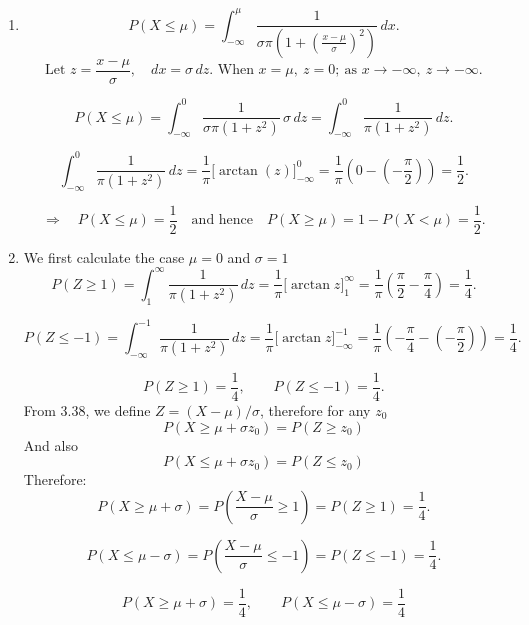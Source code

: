 \documentclass{article} %
\begin{document}
\begin{enumerate}
  \item
    \[
      P(X \le \mu)
      = \int_{-\infty}^{\mu}
      \frac{1}{\sigma\pi\left(1+\left(\frac{x-\mu}{\sigma}\right)^2\right)}\,dx.
    \]
    \[
      \text{Let } z=\frac{x-\mu}{\sigma},\quad dx=\sigma\,dz.
      \text{ When } x=\mu,\ z=0;\ \text{as } x\to -\infty,\ z\to -\infty.
    \]

    \[
      P(X \le \mu)
      = \int_{-\infty}^{0} \frac{1}{\sigma\pi(1+z^2)}\,\sigma\,dz
      = \int_{-\infty}^{0} \frac{1}{\pi(1+z^2)}\,dz.
    \]

    \[
      \int_{-\infty}^{0} \frac{1}{\pi(1+z^2)}\,dz
      = \frac{1}{\pi}\Big[\arctan(z)\Big]_{-\infty}^{0}
      = \frac{1}{\pi}\left(0-\left(-\frac{\pi}{2}\right)\right)
      = \frac{1}{2}.
    \]

    \[
      \Rightarrow\quad P(X\le \mu)=\frac12
      \quad\text{and hence}\quad
      P(X\ge \mu)=1-P(X<\mu)=\frac12.
    \]
  \item We first calculate the case $\mu = 0$ and $\sigma = 1$
    \[
      P(Z \ge 1)
      = \int_{1}^{\infty} \frac{1}{\pi(1+z^2)}\,dz
      = \frac{1}{\pi}\Big[\arctan z\Big]_{1}^{\infty}
      = \frac{1}{\pi}\left(\frac{\pi}{2}-\frac{\pi}{4}\right)
      = \frac{1}{4}.
    \]

    \[
      P(Z \le -1)
      = \int_{-\infty}^{-1} \frac{1}{\pi(1+z^2)}\,dz
      = \frac{1}{\pi}\Big[\arctan z\Big]_{-\infty}^{-1}
      = \frac{1}{\pi}\left(-\frac{\pi}{4}-\left(-\frac{\pi}{2}\right)\right)
      = \frac{1}{4}.
    \]

    \[
      P(Z \ge 1)=\frac14,
      \qquad
      P(Z \le -1)=\frac14.
    \]
    From 3.38, we define $Z = (X -\mu)/\sigma$, therefore for any $z_0$
    $$
    P(X \ge \mu+\sigma z_0) = P(Z \ge z_0)
    $$
    And also
    $$
    P(X \le \mu+\sigma z_0) = P(Z \le z_0)
    $$
    Therefore:
    \[
      P(X \ge \mu+\sigma)
      = P\!\left(\frac{X-\mu}{\sigma} \ge 1\right)
      = P(Z \ge 1)
      = \frac{1}{4}.
    \]

    \[
      P(X \le \mu-\sigma)
      = P\!\left(\frac{X-\mu}{\sigma} \le -1\right)
      = P(Z \le -1)
      = \frac{1}{4}.
    \]

    \[
      \,P(X \ge \mu+\sigma)=\frac14,\qquad P(X \le \mu-\sigma)=\frac14\,
    \]
\end{enumerate}
\end{document}
